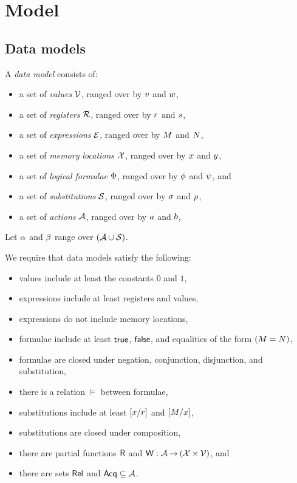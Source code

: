 \section{Model}
\label{sec:semi:model}
\subsection{Data models}
\label{sec:semi:preliminaries}

A \emph{data model} consists of:
\begin{itemize}
\item a set of \emph{values} $\mathcal{V}$, ranged over by
  $v$ and $w$,
\item a set of \emph{registers} $\mathcal{R}$, ranged over by
  $r$ and $s$,
\item a set of \emph{expressions} $\mathcal{E}$, ranged over by
  $M$ and $N$,
\item a set of \emph{memory locations} $\mathcal{X}$, ranged over by
  $x$ and $y$,
\item a set of \emph{logical formulae} $\Phi$, ranged over by
  $\phi$ and $\psi$, and
\item a set of \emph{substitutions} $\mathcal{S}$, ranged over by
  $\sigma$ and $\rho$,
\item a set of \emph{actions} $\mathcal{A}$, ranged over by $a$ and $b$,
\end{itemize}
Let $\alpha$ and $\beta$ range over $(\mathcal{A}\cup\mathcal{S})$.

We require that data models satisfy the following:
\begin{itemize}
\item values include at least the constants $0$ and $1$,
\item expressions include at least registers and values,
\item expressions do not include memory locations,
\item formulae include at least $\mathsf{true}$, $\mathsf{false}$, and equalities of the form $(M=N)$,
\item formulae are closed under negation, conjunction, disjunction, and substitution,
\item there is a relation $\vDash$ between formulae, 
\item substitutions include at least $[x/r]$ and $[M/x]$,
\item substitutions are closed under composition,
\item there are partial functions $\mathsf{R}$ and $\mathsf{W}: \mathcal{A} \mathbin\rightarrow (\mathcal{X}
  \times \mathcal{V})$, and
\item there are sets $\mathsf{Rel}$ and $\mathsf{Acq} \subseteq\mathcal{A}$.
\end{itemize}

